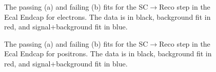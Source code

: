 \begin{thebibliography}{10}
\begin{figure}[htb]
  \begin{center}
    \caption{The passing (a) and failing (b) fits for the SC$\to$Reco step in the Ecal Endcap for electrons.
             The data is in black, background fit in red, and signal+background fit in blue.}
  \end{center}
\end{figure}

\begin{figure}[htb]
  \begin{center}
    \caption{The passing (a) and failing (b) fits for the SC$\to$Reco step in the Ecal Endcap for positrons.
             The data is in black, background fit in red, and signal+background fit in blue.}
  \end{center}
\end{figure}




\end{thebibliography}
